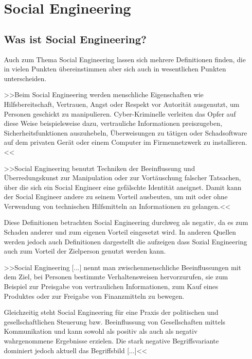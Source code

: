 \chapter{Social Engineering}\label{ch:SocialEngineering}

\section{Was ist Social Engineering?}

Auch zum Thema Social Engineering lassen sich mehrere Definitionen finden, die in vielen Punkten übereinstimmen aber sich auch in wesentlichen Punkten unterscheiden. 

>>Beim Social Engineering werden menschliche Eigenschaften wie Hilfsbereitschaft, Vertrauen, Angst oder Respekt vor Autorität ausgenutzt, um Personen geschickt zu manipulieren. Cyber-Kriminelle verleiten das Opfer auf diese Weise beispielsweise dazu, vertrauliche Informationen preiszugeben, Sicherheitsfunktionen auszuhebeln, Überweisungen zu tätigen oder Schadsoftware auf dem privaten Gerät oder einem Computer im Firmennetzwerk zu installieren.<<\cite{bsi}

>>Social Engineering benutzt Techniken der Beeinflussung und Überredungskunst zur Manipulation oder zur Vortäuschung falscher Tatsachen, über die sich ein Social Engineer eine gefälschte Identität aneignet. Damit kann der Social Engineer andere zu seinem Vorteil ausbeuten, um mit oder ohne Verwendung von technischen Hilfsmitteln an Informationen zu gelangen.<<\cite{mitn}

Diese Definitionen betrachten Social Engineering durchweg als negativ, da es zum Schaden anderer und zum eigenen Vorteil eingesetzt wird. In anderen Quellen werden jedoch auch Definitionen dargestellt die aufzeigen dass Sozial Engineering auch zum Vorteil der Zielperson genutzt werden kann.

>>Social Engineering [...] nennt man zwischenmenschliche Beeinflussungen mit dem Ziel, bei Personen bestimmte Verhaltensweisen hervorzurufen, sie zum Beispiel zur Preisgabe von vertraulichen Informationen, zum Kauf eines Produktes oder zur Freigabe von Finanzmitteln zu bewegen.

Gleichzeitig steht Social Engineering für eine Praxis der politischen und gesellschaftlichen Steuerung bzw. Beeinflussung von Gesellschaften mittels Kommunikation und kann sowohl als positiv als auch als negativ wahrgenommene Ergebnisse erzielen. Die stark negative Begriffsvariante dominiert jedoch aktuell das Begriffsbild [...]<<\cite{wiki}

